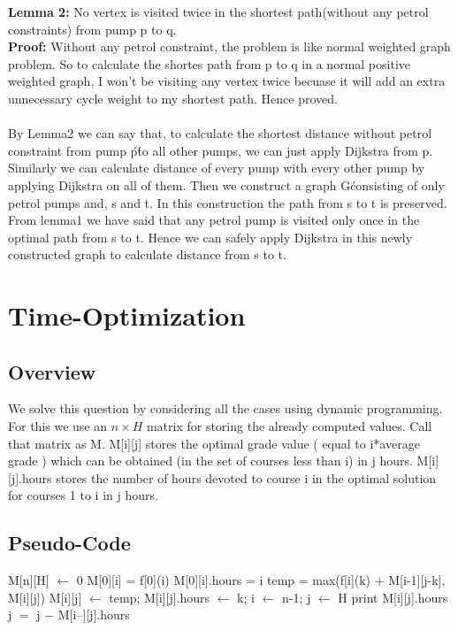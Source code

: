 \documentclass{article}
\begin{document}
\textbf{Lemma 2:} No vertex is visited twice in the shortest path(without any petrol constraints) from pump p to q.\\
\textbf{Proof:} Without any petrol constraint, the problem is like normal weighted graph problem. So to calculate the shortes path from p to
q in a normal positive weighted graph, I won't be visiting any vertex twice becuase it will add an extra unnecessary cycle weight to my shortest path. 
Hence proved.\\
\\
By Lemma2 we can say that, to calculate the shortest distance without petrol constraint from pump \'p\' to all other pumps, 
we can just apply Dijkstra from p. Similarly we can calculate distance of every pump with every other pump by applying Dijkstra on all of them.
Then we construct a graph G\' consisting of only petrol pumps and, s and t. In this construction the path from s to t is preserved. From lemma1 we have said that
any petrol pump is visited only once in the optimal path from s to t. Hence we can safely apply Dijkstra in this newly constructed graph to calculate distance
from s to t.


\newpage
\section{Time-Optimization}
\subsection{Overview}
We solve this question by considering all the cases using dynamic programming. For this we use an $n\times H$ matrix for storing the already computed
values. Call that matrix as M.
M[i][j] stores the optimal grade value ( equal to i*average grade ) which can be obtained (in the set of courses less than i) in j hours. 
M[i][j].hours stores the number of hours devoted to course i in the optimal solution for courses 1 to i in j hours.\\

\subsection{Pseudo-Code}
\begin{algorithmic}[1]
  \State M[n][H] $\gets$ $0$
  \State M[0][i] = f[0](i)
  \State M[0][i].hours = i
  \EndFor
  \State temp = max(f[i](k) + M[i-1][j-k], M[i][j]) 
  \State M[i][j] $\gets$ temp; M[i][j].hours $\gets$ k;
  \EndIf
  \EndFor
  \EndFor
  \EndFor
  \State i $\gets$ n-1; j $\gets$ H
  \State print M[i][j].hours
  \State j $=$ j $-$ M[i--][j].hours 
  \EndWhile
  \EndProcedure 
\end{algorithmic}
\end{document}
